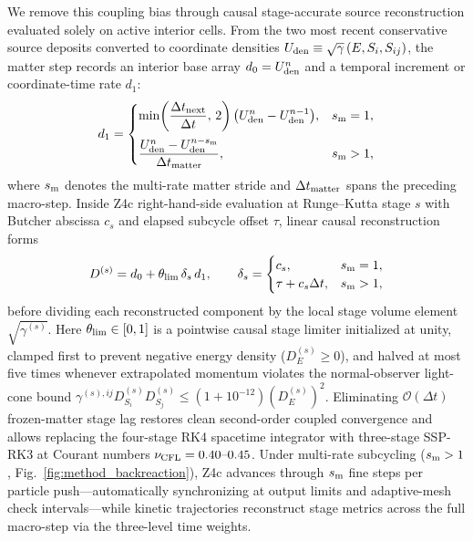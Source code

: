 We remove this coupling bias through causal stage-accurate source reconstruction evaluated solely on active interior cells. From the two most recent conservative source deposits converted to coordinate densities $U_{\rm den} \equiv \sqrt{\gamma}\,(E, S_i, S_{ij})$, the matter step records an interior base array $d_0 = U_{\rm den}^n$ and a temporal increment or coordinate-time rate $d_1$:
\begin{equation}\label{eq:stagea_slope}
d_1 =
\begin{cases}
\displaystyle \min\!\left(\frac{\Delta t_{\rm next}}{\Delta t},\, 2\right)\bigl(U_{\rm den}^n - U_{\rm den}^{n-1}\bigr), & s_{\rm m} = 1, \\[10pt]
\displaystyle \frac{U_{\rm den}^n - U_{\rm den}^{n-s_{\rm m}}}{\Delta t_{\rm matter}}, & s_{\rm m} > 1,
\end{cases}
\end{equation}
where $s_{\rm m}$ denotes the multi-rate matter stride and $\Delta t_{\rm matter}$ spans the preceding macro-step. Inside Z4c right-hand-side evaluation at Runge--Kutta stage $s$ with Butcher abscissa $c_s$ and elapsed subcycle offset $\tau$, linear causal reconstruction forms
\begin{equation}\label{eq:stagea_recon}
D^{(s)} = d_0 + \theta_{\rm lim}\,\delta_s\,d_1, \qquad
\delta_s =
\begin{cases}
c_s, & s_{\rm m} = 1, \\
\tau + c_s \Delta t, & s_{\rm m} > 1,
\end{cases}
\end{equation}
before dividing each reconstructed component by the local stage volume element $\sqrt{\gamma^{(s)}}$. Here $\theta_{\rm lim} \in [0, 1]$ is a pointwise causal stage limiter initialized at unity, clamped first to prevent negative energy density ($D_E^{(s)} \ge 0$), and halved at most five times whenever extrapolated momentum violates the normal-observer light-cone bound $\gamma^{(s),ij} D_{S_i}^{(s)} D_{S_j}^{(s)} \le (1 + 10^{-12})(D_E^{(s)})^2$. Eliminating $\mathcal{O}(\Delta t)$ frozen-matter stage lag restores clean second-order coupled convergence and allows replacing the four-stage RK4 spacetime integrator with three-stage SSP-RK3 at Courant numbers $\nu_{\rm CFL} = 0.40\text{--}0.45$. Under multi-rate subcycling ($s_{\rm m} > 1$, Fig.~\ref{fig:method_backreaction}), Z4c advances through $s_{\rm m}$ fine steps per particle push—automatically synchronizing at output limits and adaptive-mesh check intervals—while kinetic trajectories reconstruct stage metrics across the full macro-step via the three-level time weights.

